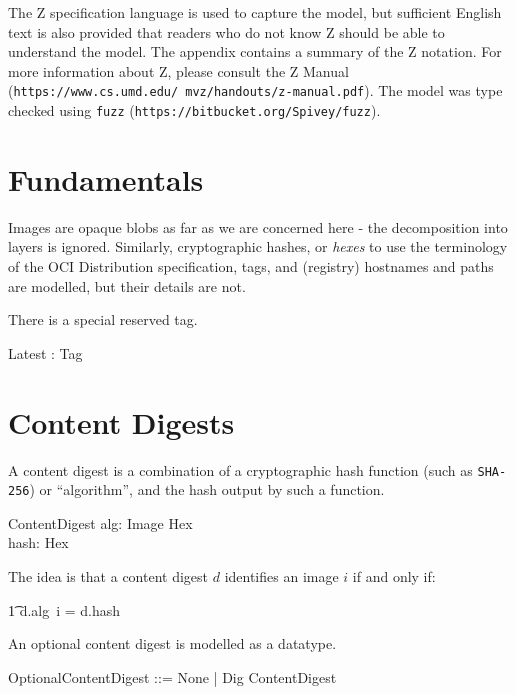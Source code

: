 \documentclass[a4paper,twoside,12pt]{article}
\begin{document}
The Z specification language is used to capture the model, but sufficient English text is also provided that readers who do not know Z should be able to understand the model. The appendix contains a summary of the Z notation.
For more information about Z, please consult the Z Manual (\texttt{https://www.cs.umd.edu/~mvz/handouts/z-manual.pdf}).
The model was type checked using \texttt{fuzz} (\texttt{https://bitbucket.org/Spivey/fuzz}).

\section{Fundamentals}

Images are opaque blobs as far as we are concerned here - the decomposition into layers is ignored.
Similarly, cryptographic hashes, or \textit{hexes} to use the terminology of the OCI Distribution specification, tags, and (registry) hostnames and paths are modelled, but their details are not.
\begin{zed}
\end{zed}

There is a special reserved tag.
\begin{axdef}
    Latest : Tag
\end{axdef}

\newpage
\section{Content Digests}

A content digest is a combination of a cryptographic hash function (such as \texttt{SHA-256}) or ``algorithm'', and the hash output by such a function. 
\begin{schema}{ContentDigest}
    alg: Image \fun Hex \\
    hash: Hex \\ 
\end{schema}

The idea is that a content digest $d$ identifies an image $i$ if and only if:\\
\begin{zed}
\t1 d.alg~i = d.hash
\end{zed}

An optional content digest is modelled as a datatype.
\begin{zed}
    OptionalContentDigest ::= None | Dig \ldata ContentDigest \rdata
\end{zed}
\end{document}
